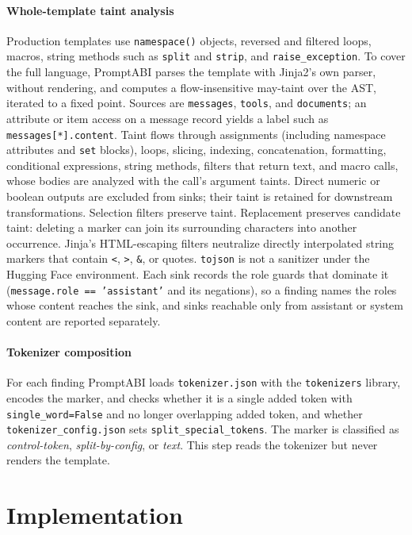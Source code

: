 \documentclass[10pt,conference]{IEEEtran}
\newcommand{\tool}{PromptABI\xspace}
\begin{document}
\paragraph{Whole-template taint analysis} Production templates use
\texttt{namespace()} objects, reversed and filtered loops, macros, string
methods such as \texttt{split} and \texttt{strip}, and
\texttt{raise\_exception}. To cover the full language, \tool parses the template
with Jinja2's own parser, without rendering, and computes a flow-insensitive
may-taint over the AST, iterated to a fixed point. Sources are
\texttt{messages}, \texttt{tools}, and \texttt{documents}; an attribute or item
access on a message record yields a label such as
\texttt{messages[*].content}. Taint flows through assignments (including
namespace attributes and \texttt{set} blocks), loops, slicing, indexing,
concatenation, formatting, conditional expressions, string methods, filters
that return text, and macro calls, whose bodies are analyzed with the call's
argument taints. Direct numeric or boolean outputs are excluded from sinks; their taint is
retained for downstream transformations. Selection filters preserve taint. Replacement preserves candidate taint: deleting a marker can join its
surrounding characters into another occurrence. Jinja's HTML-escaping filters
neutralize directly interpolated string markers that contain \texttt{<},
\texttt{>}, \texttt{\&}, or quotes. \texttt{tojson} is not a sanitizer under the
Hugging Face environment. Each sink records the role guards that dominate it
(\texttt{message.role == 'assistant'} and its negations), so a finding names
the roles whose content reaches the sink, and sinks reachable only from
assistant or system content are reported separately.

\paragraph{Tokenizer composition} For each finding \tool loads
\texttt{tokenizer.json} with the \texttt{tokenizers} library, encodes the
marker, and checks whether it is a single added token with
\texttt{single\_word=False} and no longer overlapping added token, and whether
\texttt{tokenizer\_config.json} sets \texttt{split\_special\_tokens}. The marker
is classified as \emph{control-token}, \emph{split-by-config}, or \emph{text}.
This step reads the tokenizer but never renders the template.

\section{Implementation}
\label{sec:impl}
\end{document}
